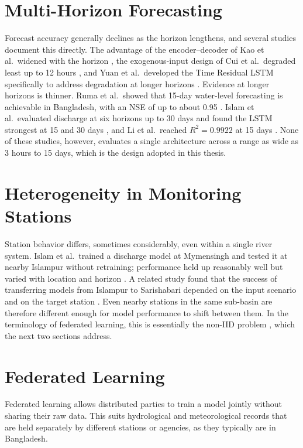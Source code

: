 \section{Multi-Horizon Forecasting}
\label{sec:2.8}

Forecast accuracy generally declines as the horizon lengthens, and several
studies document this directly. The advantage of the encoder--decoder of Kao
et al.\ widened with the horizon \cite{Kao2020}, the exogenous-input design of
Cui et al.\ degraded least up to 12 hours \cite{Cui2022}, and Yuan et al.\
developed the Time Residual LSTM specifically to address degradation at longer
horizons \cite{Yuan2023}. Evidence at longer horizons is thinner. Ruma et al.\
showed that 15-day water-level forecasting is achievable in Bangladesh, with an
NSE of up to about 0.95 \cite{Ruma2023}. Islam et al.\ evaluated discharge at six
horizons up to 30 days and found the LSTM strongest at 15 and 30 days
\cite{Islam2026a}, and Li et al.\ reached $R^2 = 0.9922$ at 15 days
\cite{Li2025}. None of these studies, however, evaluates a single architecture
across a range as wide as 3 hours to 15 days, which is the design adopted in
this thesis.

\section{Heterogeneity in Monitoring Stations}
\label{sec:2.9}

Station behavior differs, sometimes considerably, even within a single river
system. Islam et al.\ trained a discharge model at Mymensingh and tested it at
nearby Islampur without retraining; performance held up reasonably well but
varied with location and horizon \cite{Islam2026a}. A related study found that
the success of transferring models from Islampur to Sarishabari depended on
the input scenario and on the target station \cite{Islam2026b}. Even nearby
stations in the same sub-basin are therefore different enough for model
performance to shift between them. In the terminology of federated learning,
this is essentially the non-IID problem \cite{Zhu2021,Chen2025}, which the next
two sections address.

\section{Federated Learning}
\label{sec:2.10}

Federated learning allows distributed parties to train a model jointly without
sharing their raw data. This suits hydrological and meteorological records
that are held separately by different stations or agencies, as they typically
are in Bangladesh.

